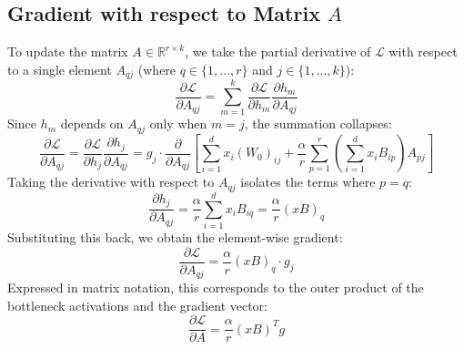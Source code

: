 \documentclass{article}
\begin{document}
\subsection{Gradient with respect to Matrix $A$}
To update the matrix $A \in \mathbb{R}^{r \times k}$, we take the partial derivative of $\mathcal{L}$ with respect to a single element $A_{qj}$ (where $q \in \{1,\dots,r\}$ and $j \in \{1,\dots,k\}$):
\begin{equation}
    \frac{\partial \mathcal{L}}{\partial A_{qj}} = \sum_{m=1}^k \frac{\partial \mathcal{L}}{\partial h_m} \frac{\partial h_m}{\partial A_{qj}}
\end{equation}
Since $h_m$ depends on $A_{qj}$ only when $m = j$, the summation collapses:
\begin{equation}
    \frac{\partial \mathcal{L}}{\partial A_{qj}} = \frac{\partial \mathcal{L}}{\partial h_j} \frac{\partial h_j}{\partial A_{qj}} = g_j \cdot \frac{\partial}{\partial A_{qj}} \left[ \sum_{i=1}^d x_i (W_0)_{ij} + \frac{\alpha}{r} \sum_{p=1}^r \left( \sum_{i=1}^d x_i B_{ip} \right) A_{pj} \right]
\end{equation}
Taking the derivative with respect to $A_{qj}$ isolates the terms where $p = q$:
\begin{equation}
    \frac{\partial h_j}{\partial A_{qj}} = \frac{\alpha}{r} \sum_{i=1}^d x_i B_{iq} = \frac{\alpha}{r} (x B)_q
\end{equation}
Substituting this back, we obtain the element-wise gradient:
\begin{equation}
    \frac{\partial \mathcal{L}}{\partial A_{qj}} = \frac{\alpha}{r} (x B)_q \cdot g_j
\end{equation}
Expressed in matrix notation, this corresponds to the outer product of the bottleneck activations and the gradient vector:
\begin{equation}
    \frac{\partial \mathcal{L}}{\partial A} = \frac{\alpha}{r} (x B)^T g
\end{equation}
\end{document}

